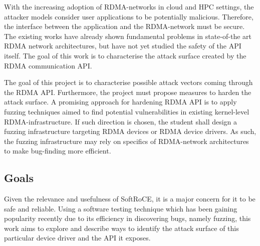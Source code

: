 With the increasing adoption of RDMA-networks in cloud and HPC settings, the attacker models consider user applications 
to be potentially malicious. Therefore, the interface between the application and the RDMA-network must be secure.
The existing works have already shown fundamental problems in state-of-the art RDMA network architectures, but 
have not yet studied the safety of the API itself. The goal of this work is to characterise the attack surface 
created by the RDMA communication API.

The goal of this project is to characterise possible attack vectors coming through the RDMA API. Furthermore, the 
project must propose measures to harden the attack surface. A promising approach for hardening RDMA API is to apply 
fuzzing techniques aimed to find potential vulnerabilities in existing kernel-level RDMA-infrastructure. If such 
direction is chosen, the student shall design a fuzzing infrastructure targeting RDMA devices or RDMA device 
drivers. As such, the fuzzing infrastructure may rely on specifics of RDMA-network architectures to make bug-finding 
more efficient.

\subsection{Goals}

Given the relevance and usefulness of SoftRoCE, it is a major concern for it to be safe and reliable.
Using a software testing technique which has been gaining popularity recently due to its efficiency in
discovering bugs, namely fuzzing, this work aims to explore and describe ways to identify the attack surface
of this particular device driver and the API it exposes.

